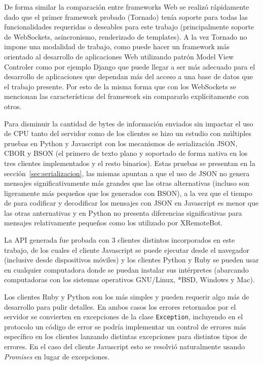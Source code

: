 De forma similar la comparación entre frameworks Web se realizó rápidamente
dado que el primer framework probado (Tornado) tenía soporte para todas
las funcionalidades requeridas o deseables para este trabajo (principalmente
soporte de WebSockets, asincronismo, renderizado de templates).
A la vez Tornado no impone
una modalidad de trabajo, como puede hacer un framework más orientado al
desarrollo de aplicaciones Web utilizando patrón Model View Controler
como por ejemplo Django que puede llegar a ser más adecuado para el desarrollo
de aplicaciones que dependan más del acceso a una base de datos que el
trabajo presente. Por esto de la misma forma que con los WebSockets se mencionan
las características del framework sin compararlo explícitamente con otros.

Para disminuir la cantidad de bytes de información enviados sin impactar el
uso de CPU tanto del servidor como de los clientes se hizo un estudio con
múltiples pruebas en Python y Javascript con los mecanismos de serialización
JSON, CBOR y BSON (el primero de texto plano y soportado de forma nativa en los
tres clientes implementados y el resto binarios). Estas pruebas se presentan
en la sección~\ref{sec:serializacion}, las mismas apuntan a que el uso de JSON
no genera mensajes significativamente más grandes que las otras alternativas
(incluso son ligeramente más pequeños que los generados con BSON), a la vez
que el tiempo de para codificar y decodificar los mensajes con JSON en
Javascript es menor que las otras anternativas y en Python no presenta
diferencias significativas para mensajes relativamente pequeños como los utilizado
por XRemoteBot.

La API generada fue probada con 3 clientes distintos incorporados en este
trabajo, de los cuales el cliente Javascript se puede ejecutar desde el
navegador (inclusive desde dispositivos móviles) y los clientes Python y
Ruby se pueden usar en cualquier computadora
donde se puedan instalar sus intérpretes (abarcando computadoras con
los sistemas operativos GNU/Linux, *BSD, Windows y Mac).

Los clientes Ruby y Python son los más simples y pueden requerir algo
más de desarrollo para pulir detalles. En ambos casos los errores
retornados por el servidor se convierten en excepciones de la clase
\texttt{Exception}, incluyendo en el protocolo un código de error
se podría implementar un control de errores más específico en
los clientes lanzando distintas excepciones para distintos tipos
de errores. En el caso del cliente Javascript esto se resolvió
naturalmente usando \textit{Promises} en lugar de excepciones.

